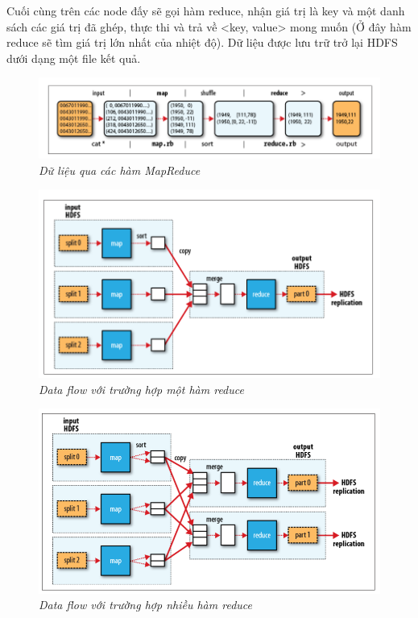 \documentclass[12pt]{report}
\begin{document}
Cuối cùng trên các node đấy sẽ gọi hàm reduce, nhận giá trị là key và một danh sách các giá trị đã ghép, thực thi và trả về <key, value> mong muốn (Ở đây hàm reduce sẽ tìm giá trị lớn nhất của nhiệt độ). Dữ liệu được lưu trữ trở lại HDFS dưới dạng một file kết quả.

\begin{figure}[H]
\centering
\includegraphics[width=\textwidth]{data_flow.png}
\caption{\it Dữ liệu qua các hàm MapReduce}
\end{figure}

\begin{figure}[H]
\centering
\includegraphics[width=\textwidth]{single_reduce.png}
\caption{\it Data flow với trường hợp một hàm reduce}
\end{figure}

\begin{figure}[H]
\centering
\includegraphics[width=\textwidth]{multi_reduce.png}
\caption{\it Data flow với trường hợp nhiều hàm reduce}
\end{figure}
\end{document}
